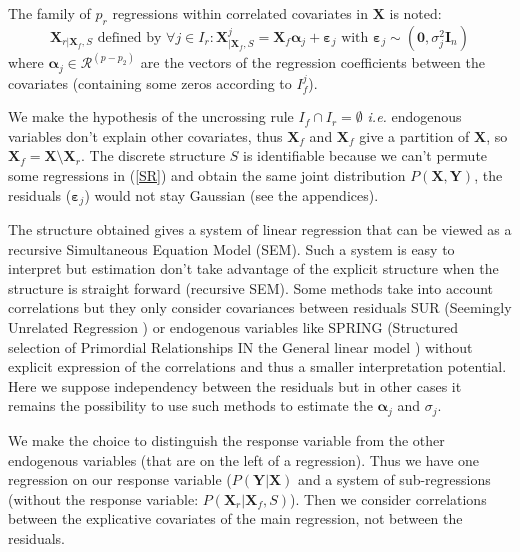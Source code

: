 \documentclass[11pt,a4paper]{article}
\begin{document}
The family of $p_r$ regressions within correlated covariates in $\boldsymbol{X}$ is noted:
	\begin{equation}
		\boldsymbol{X}_{r|\boldsymbol{X}_f,S} \textrm{ defined by }\forall j \in I_r: \boldsymbol{X}^j_{|\boldsymbol{X}_f,S}=\boldsymbol{X}_f\boldsymbol{\alpha}_j+\boldsymbol{\varepsilon}_j \textrm{ with } \boldsymbol{\varepsilon}_j \sim(\boldsymbol{0},\sigma^2_j\boldsymbol{I}_n) \label{SR}
	\end{equation}
		where $\boldsymbol{\alpha}_j \in \mathcal{R}^{(p-p_2)}$ are the vectors of the regression coefficients between the covariates (containing some zeros according to $I_f^j$).

We make the hypothesis of the uncrossing rule $I_f\cap I_r=\emptyset$ {\it i.e.} endogenous variables don't explain other covariates, thus $\boldsymbol{X}_f$ and $\boldsymbol{X}_f$ give a partition of $\boldsymbol{X}$, so $\boldsymbol{X}_f=\boldsymbol{X}\setminus \boldsymbol{X}_r$.
The discrete structure $S$ is identifiable because we can't permute some regressions in (\ref{SR}) and obtain the same joint distribution $P(\boldsymbol{X},\boldsymbol{Y})$, the residuals ($\boldsymbol{\varepsilon}_j$) would not stay Gaussian (see the appendices).



The structure obtained gives a system of linear regression that can be viewed as a recursive Simultaneous Equation Model (\textsc{SEM})\cite{davidson1993estimation}. Such a system is easy to interpret but estimation don't take advantage of the explicit structure \cite{TIMM} when the structure is straight forward (recursive \textsc{SEM}).
  	Some methods take into account correlations but they only consider covariances between residuals \textsc{SUR} (Seemingly Unrelated Regression \cite{SURzellner}) or  endogenous variables like \textsc{SPRING} (Structured selection of Primordial Relationships IN the General linear model \cite{chiquetconf}) without explicit expression of the correlations and thus a smaller interpretation potential.
  	\\ Here we suppose independency between the residuals but in other cases it remains the possibility to use such methods to estimate the $\boldsymbol{\alpha}_j$ and $\sigma_j$.

 	
	  We make the choice to distinguish the response variable from the other endogenous variables (that are on the left of a regression). Thus we have one regression on our response variable ($P(\boldsymbol{Y}|\boldsymbol{X})$ and a system of sub-regressions (without the response variable: $P(\boldsymbol{X}_r|\boldsymbol{X}_f,S)$). Then we consider correlations between the explicative covariates of the main regression, not between the residuals.
	 
\end{document}

